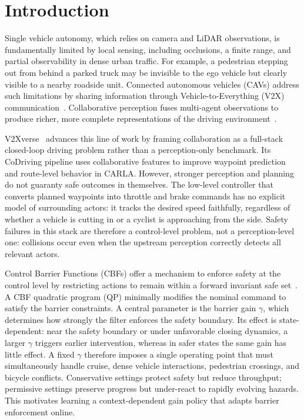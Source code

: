 \section{Introduction}
\label{Introduction}

Single vehicle autonomy, which relies on camera and LiDAR observations, is fundamentally limited by local sensing, including occlusions, a finite range, and partial observability in dense urban traffic. For example, a pedestrian stepping out from behind a parked truck may be invisible to the ego vehicle but clearly visible to a nearby roadside unit. Connected autonomous vehicles (CAVs) address such limitations by sharing information through Vehicle-to-Everything (V2X) communication~\cite{han2023collaborative, huang2023v2xsurvey}. Collaborative perception fuses multi-agent observations to produce richer, more complete representations of the driving environment~\cite{teufel2024collective, wang2020v2vnet, HuEtAl2022}.

V2Xverse~\cite{liu2024v2xverse} advances this line of work by framing collaboration as a full-stack closed-loop driving problem rather than a perception-only benchmark. Its CoDriving pipeline uses collaborative features to improve waypoint prediction and route-level behavior in CARLA. However, stronger perception and planning do not guaranty safe outcomes in themselves. The low-level controller that converts planned waypoints into throttle and brake commands has no explicit model of surrounding actors: it tracks the desired speed faithfully, regardless of whether a vehicle is cutting in or a cyclist is approaching from the side. Safety failures in this stack are therefore a control-level problem, not a perception-level one: collisions occur even when the upstream perception correctly detects all relevant actors.

Control Barrier Functions (CBFs) offer a mechanism to enforce safety at the control level by restricting actions to remain within a forward invariant safe set~\cite{ames2017cbf, ames_control_2019}. A CBF quadratic program (QP) minimally modifies the nominal command to satisfy the barrier constraints. A central parameter is the barrier gain $\gamma$, which determines how strongly the filter enforces the safety boundary. Its effect is state-dependent: near the safety boundary or under unfavorable closing dynamics, a larger $\gamma$ triggers earlier intervention, whereas in safer states the same gain has little effect. A fixed $\gamma$ therefore imposes a single operating point that must simultaneously handle cruise, dense vehicle interactions, pedestrian crossings, and bicycle conflicts. Conservative settings protect safety but reduce throughput; permissive settings preserve progress but under-react to rapidly evolving hazards. This motivates learning a context-dependent gain policy that adapts barrier enforcement online.

